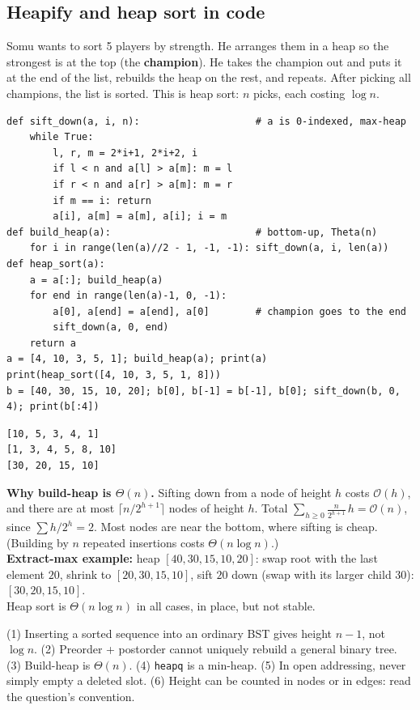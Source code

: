 \documentclass[11pt,a4paper]{article}
\newcommand{\Oh}{\mathcal{O}}
\newcommand{\py}[1]{\texttt{#1}}
\begin{document}
\subsection{Heapify and heap sort in code}
\begin{story}
Somu wants to sort 5 players by strength. He arranges them in a heap so the strongest is at the top (the \textbf{champion}). He takes the champion out and puts it at the end of the list, rebuilds the heap on the rest, and repeats. After picking all champions, the list is sorted. This is heap sort: $n$ picks, each costing $\log n$.
\end{story}
\begin{lstlisting}
def sift_down(a, i, n):                    # a is 0-indexed, max-heap
    while True:
        l, r, m = 2*i+1, 2*i+2, i
        if l < n and a[l] > a[m]: m = l
        if r < n and a[r] > a[m]: m = r
        if m == i: return
        a[i], a[m] = a[m], a[i]; i = m
def build_heap(a):                         # bottom-up, Theta(n)
    for i in range(len(a)//2 - 1, -1, -1): sift_down(a, i, len(a))
def heap_sort(a):
    a = a[:]; build_heap(a)
    for end in range(len(a)-1, 0, -1):
        a[0], a[end] = a[end], a[0]        # champion goes to the end
        sift_down(a, 0, end)
    return a
a = [4, 10, 3, 5, 1]; build_heap(a); print(a)
print(heap_sort([4, 10, 3, 5, 1, 8]))
b = [40, 30, 15, 10, 20]; b[0], b[-1] = b[-1], b[0]; sift_down(b, 0, 4); print(b[:4])
\end{lstlisting}
\begin{lstlisting}[style=out]
[10, 5, 3, 4, 1]
[1, 3, 4, 5, 8, 10]
[30, 20, 15, 10]
\end{lstlisting}
\textbf{Why build-heap is $\Theta(n)$.} Sifting down from a node of height $h$ costs $\Oh(h)$, and there are at most $\lceil n/2^{h+1}\rceil$ nodes of height $h$. Total $\sum_{h\ge0}\frac{n}{2^{h+1}}\,h=\Oh(n)$, since $\sum h/2^{h}=2$. Most nodes are near the bottom, where sifting is cheap. (Building by $n$ repeated insertions costs $\Theta(n\log n)$.)\\
\textbf{Extract-max example:} heap $[40,30,15,10,20]$: swap root with the last element $20$, shrink to $[20,30,15,10]$, sift $20$ down (swap with its larger child $30$): $[30,20,15,10]$.\\
Heap sort is $\Theta(n\log n)$ in all cases, in place, but not stable.

\begin{trap}
(1) Inserting a sorted sequence into an ordinary BST gives height $n-1$, not $\log n$. (2) Preorder + postorder cannot uniquely rebuild a general binary tree. (3) Build-heap is $\Theta(n)$. (4) \py{heapq} is a min-heap. (5) In open addressing, never simply empty a deleted slot. (6) Height can be counted in nodes or in edges: read the question's convention.
\end{trap}
\end{document}
